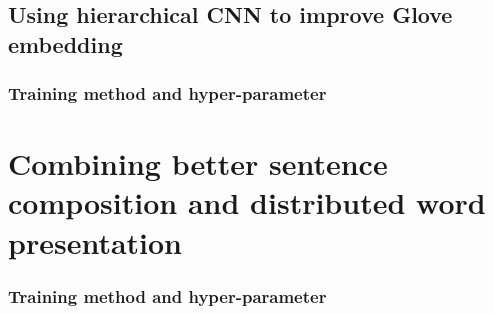 \subsection{Using hierarchical CNN to improve Glove embedding}

\subsubsection{Training method and hyper-parameter}


\section{Combining better sentence composition and distributed word presentation}

\subsubsection{Training method and hyper-parameter}
